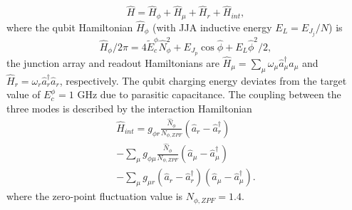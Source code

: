 \documentclass[prx,showpacs,notitlepage,twocolumn,superscriptaddress,nofootinbib,preprintnumbers,floatfix]{revtex4-2}
\begin{document}
\begin{equation}
   \hat H =\hat{H}_\phi + \hat{H}_\mu + \hat{H}_r + \hat{H}_{int},\label{Hamiltonian_total}
\end{equation}
where the qubit Hamiltonian $\hat{H}_\phi$ (with JJA inductive energy $E_L=E_{J_j}/N$) is 
\begin{equation}
\hat{H}_\phi / 2\pi = 4\tilde{E}^\phi_c \hat N_\phi^2+ E_{J_p}\cos{\hat\phi}+E_L\hat \phi^2 /2,
\end{equation}
the junction array and readout Hamiltonians are $\hat{H}_\mu = \sum_{\mu}\omega_\mu \hat a_\mu^\dagger \hat a_\mu$ and $\hat{H}_r = \omega_r \hat a_r^\dagger \hat a_r$, respectively. The qubit charging energy deviates from the target value of $E_c^{\phi}=1$ GHz due to parasitic capacitance. The coupling between the three modes is described by the interaction Hamiltonian
\begin{align}\label{eq:int_hamiltonian}
\hat{H}_{int} = g_{\phi r} \frac{\hat N_\phi}{{N_{\phi,ZPF}}} (\hat a_r-\hat a_r^\dagger)\nonumber \\ -\sum_{\mu} g_{\phi\mu} \frac{\hat N_\phi}{{N_{\phi,ZPF}}} (\hat a_\mu-\hat a_\mu^\dagger) \nonumber \\- \sum_{\mu} g_{\mu r} (\hat a_r-\hat a_r^\dagger)(\hat a_\mu-\hat a_\mu^\dagger).
\end{align}
where the zero-point fluctuation value is $N_{\phi,ZPF}=1.4$.


\end{document}
